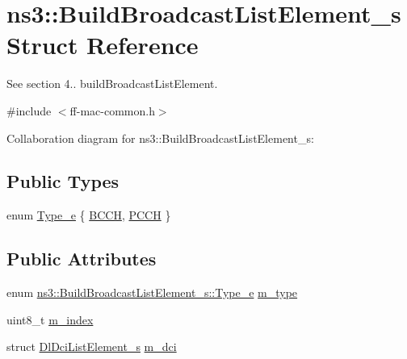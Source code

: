 \hypertarget{structns3_1_1BuildBroadcastListElement__s}{}\section{ns3\+:\+:Build\+Broadcast\+List\+Element\+\_\+s Struct Reference}
\label{structns3_1_1BuildBroadcastListElement__s}


See section 4.. build\+Broadcast\+List\+Element.  




{\ttfamily \#include $<$ff-\/mac-\/common.\+h$>$}



Collaboration diagram for ns3\+:\+:Build\+Broadcast\+List\+Element\+\_\+s\+:
\subsection*{Public Types}
\begin{DoxyCompactItemize}
\item 
enum \hyperlink{structns3_1_1BuildBroadcastListElement__s_a001a655a4792c620274db8f163701259}{Type\+\_\+e} \{ \hyperlink{structns3_1_1BuildBroadcastListElement__s_a001a655a4792c620274db8f163701259a7a89d120da2ddb997e54fb1497df8719}{B\+C\+CH}, 
\hyperlink{structns3_1_1BuildBroadcastListElement__s_a001a655a4792c620274db8f163701259a372701c3cdf6f7120663eac8f6897546}{P\+C\+CH}
 \}
\end{DoxyCompactItemize}
\subsection*{Public Attributes}
\begin{DoxyCompactItemize}
\item 
enum \hyperlink{structns3_1_1BuildBroadcastListElement__s_a001a655a4792c620274db8f163701259}{ns3\+::\+Build\+Broadcast\+List\+Element\+\_\+s\+::\+Type\+\_\+e} \hyperlink{structns3_1_1BuildBroadcastListElement__s_aea7882b9468183667c016fe2741148a9}{m\+\_\+type}
\item 
uint8\+\_\+t \hyperlink{structns3_1_1BuildBroadcastListElement__s_a70151e699801c1d93c1a98956b46ff30}{m\+\_\+index}
\item 
struct \hyperlink{structns3_1_1DlDciListElement__s}{Dl\+Dci\+List\+Element\+\_\+s} \hyperlink{structns3_1_1BuildBroadcastListElement__s_ae71037f2f42f0e168160463ab8104e78}{m\+\_\+dci}
\end{DoxyCompactItemize}


